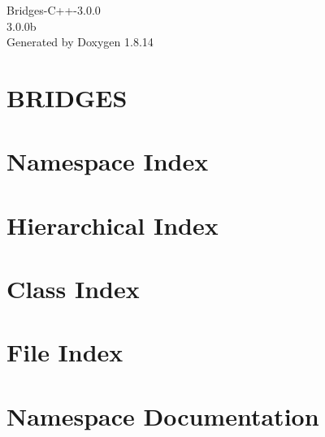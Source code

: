 \documentclass[twoside]{book}
\newcommand{\+}{\discretionary{\mbox{\scriptsize$\hookleftarrow$}}{}{}}
\newcommand{\clearemptydoublepage}{%
  \newpage{\pagestyle{empty}\cleardoublepage}%
}
\begin{document}
\hypersetup{pageanchor=false,
             bookmarksnumbered=true,
             pdfencoding=unicode
            }
\begin{titlepage}
\vspace*{7cm}
\begin{center}%
{\Large Bridges-\/\+C++-\/3.0.0 \\[1ex]\large 3.\+0.\+0b }\\
\vspace*{1cm}
{\large Generated by Doxygen 1.8.14}\\
\end{center}
\end{titlepage}
\clearemptydoublepage
{}
\tableofcontents
\clearemptydoublepage
{}
\hypersetup{pageanchor=true}

\chapter{B\+R\+I\+D\+G\+ES}
\label{index}\hypertarget{index}{}
\chapter{Namespace Index}

\chapter{Hierarchical Index}

\chapter{Class Index}

\chapter{File Index}

\chapter{Namespace Documentation}







\end{document}
